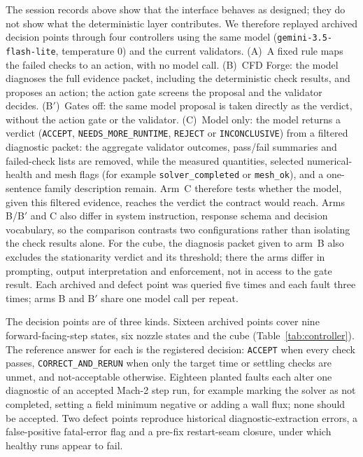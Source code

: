 \documentclass[11pt]{article}
\begin{document}
The session records above show that the interface behaves as designed; they
do not show what the deterministic layer contributes. We therefore replayed
archived decision points through four controllers using the same model
(\texttt{gemini-3.5-flash-lite}, temperature 0) and the current validators.
(A)~A fixed rule maps the failed checks to an action, with no model call.
(B)~CFD Forge: the model diagnoses the full evidence packet, including the
deterministic check results, and proposes an action; the action gate screens
the proposal and the validator decides. (B$'$)~Gates off: the same model
proposal is taken directly as the verdict, without the action gate or the
validator. (C)~Model only: the model returns a verdict
(\texttt{ACCEPT}, \texttt{NEEDS\_MORE\_RUNTIME}, \texttt{REJECT} or
\texttt{INCONCLUSIVE}) from a filtered diagnostic packet: the aggregate
validator outcomes, pass/fail summaries and failed-check lists are removed,
while the measured quantities, selected numerical-health and mesh flags (for
example \texttt{solver\_completed} or \texttt{mesh\_ok}), and a one-sentence
family description remain. Arm~C therefore tests whether the model, given
this filtered evidence, reaches the verdict the contract would reach. Arms
B/B$'$ and C also differ in system instruction, response schema and
decision vocabulary, so the comparison contrasts two configurations rather
than isolating the check results alone. For the cube, the diagnosis packet
given to arm~B also excludes the stationarity verdict and its threshold; there
the arms differ in prompting, output interpretation and enforcement, not in
access to the gate result. Each archived and defect point was queried five
times and each fault three times; arms B and B$'$ share one model call per
repeat.

The decision points are of three kinds. Sixteen archived points cover nine
forward-facing-step states, six nozzle states and the cube
(Table~\ref{tab:controller}). The reference answer for each is the
registered decision: \texttt{ACCEPT} when every check passes,
\texttt{CORRECT\_AND\_RERUN} when only the target time or settling checks
are unmet, and not-acceptable otherwise. Eighteen planted faults each alter
one diagnostic of an accepted Mach-2 step run, for example marking the solver
as not completed, setting a field minimum negative or adding a wall flux; none
should be accepted. Two defect points reproduce historical diagnostic-extraction
errors, a false-positive fatal-error flag and a pre-fix restart-seam closure,
under which healthy runs appear to fail.
\end{document}
